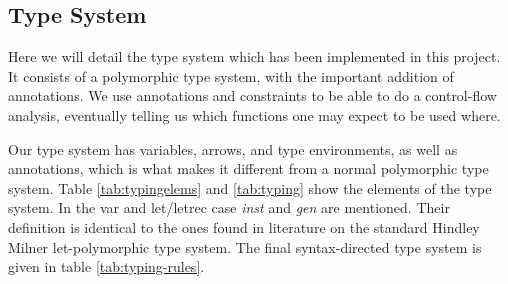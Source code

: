 \documentclass[a4paper]{article}
\begin{document}
\subsection{Type System}

Here we will detail the type system which has been implemented in this project.
It consists of a polymorphic type system, with the important addition of
annotations. We use annotations and constraints to be able to do a control-flow
analysis, eventually telling us which functions one may expect to be used where. 

Our type system has variables, arrows, and type environments, as well as
annotations, which is what makes it different from a normal polymorphic type
system. Table \ref{tab:typingelems} and \ref{tab:typing} show the elements of
the type system. In the var and let/letrec case \emph{inst} and \emph{gen} are mentioned.
Their definition is identical to the ones found in literature on the standard
Hindley Milner let-polymorphic type system. The final syntax-directed type system is given in table \ref{tab:typing-rules}.
\end{document}
